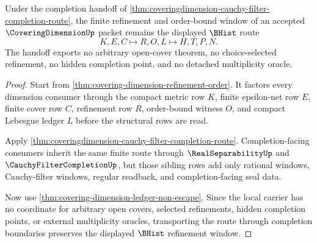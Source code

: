 \begin{theorem}
\label{thm:coveringdimension-finite-refinement-window}
Under the completion handoff of \autoref{thm:coveringdimension-cauchy-filter-completion-route}, the finite refinement and order-bound window of an accepted $\CoveringDimensionUp$ packet remains the displayed $\BHist$ route
$$
K,E,C \longmapsto R,O,L \longmapsto H,T,P,N .
$$
The handoff exports no arbitrary open-cover theorem, no choice-selected refinement, no hidden completion point, and no detached multiplicity oracle.
\end{theorem}
\begin{proof}
Start from \autoref{thm:covering-dimension-refinement-order}. It factors every dimension consumer through the compact metric row $K$, finite epsilon-net row $E$, finite cover row $C$, refinement row $R$, order-bound witness $O$, and compact Lebesgue ledger $L$ before the structural rows are read.

Apply \autoref{thm:coveringdimension-cauchy-filter-completion-route}. Completion-facing consumers inherit the same finite route through $\RealSeparabilityUp$ and $\CauchyFilterCompletionUp$, but those sibling rows add only rational windows, Cauchy-filter windows, regular readback, and completion-facing seal data.

Now use \autoref{thm:covering-dimension-ledger-non-escape}. Since the local carrier has no coordinate for arbitrary open covers, selected refinements, hidden completion points, or external multiplicity oracles, transporting the route through completion boundaries preserves the displayed $\BHist$ refinement window.
\end{proof}
